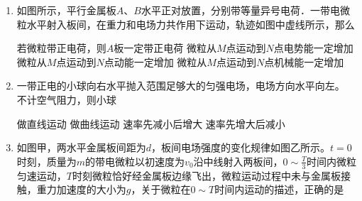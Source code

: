 \begin{enumerate}[leftmargin=0em]
\item
{}
如图所示，平行金属板$ A $、$ B $水平正对放置，分别带等量异号电荷．一带电微粒水平射入板间，在重力和电场力共作用下运动，轨迹如图中虚线所示，那么  


\begin{minipage}[h!]{0.7\linewidth}
\vspace{0.3em}
\fourchoices
{若微粒带正电荷，则$ A $板一定带正电荷}
{微粒从$ M $点运动到$ N $点电势能一定增加}
{微粒从$ M $点运动到$ N $点动能一定增加}
{微粒从$ M $点运动到$ N $点机械能一定增加}
\vspace{0.3em}
\end{minipage}
\hfill
\begin{minipage}[h!]{0.3\linewidth}
\flushright
\vspace{0.3em}

\vspace{0.3em}
\end{minipage}





\item
{}
一带正电的小球向右水平抛入范围足够大的匀强电场，电场方向水平向左。 不计空气阻力，则小球  


\begin{minipage}[h!]{0.7\linewidth}
\vspace{0.3em}
\fourchoices
{做直线运动}
{做曲线运动}
{速率先减小后增大}
{速率先增大后减小}
\vspace{0.3em}
\end{minipage}
\hfill
\begin{minipage}[h!]{0.3\linewidth}
\flushright
\vspace{0.3em}

\vspace{0.3em}
\end{minipage}




\item
{}
如图甲，两水平金属板间距为$ d $，板间电场强度的变化规律如图乙所示。$ t=0 $时刻，质量为$ m $的带电微粒以初速度为$ v_{0} $沿中线射入两板间，$ 0 \sim \frac{T}{3} $时间内微粒匀速运动，$ T $时刻微粒恰好经金属板边缘飞出，微粒运动过程中未与金属板接触，重力加速度的大小为$ g $，关于微粒在$ 0 \sim T $时间内运动的描述，正确的是  
\begin{figure}[h!]
\centering

\end{figure}




\end{enumerate}
